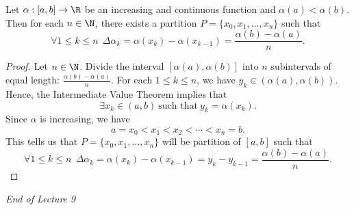 \begin{lemma}\label{lemma 2}
    Let \( \alpha:[a,b] \to \R  \) be an increasing and continuous function and \( \alpha(a) < \alpha(b) \). Then for each \( n \in \N \), there exists a partition \( P = \{  {x}_{0}, {x}_{1}, \dots, {x}_{n} \}  \) such that   
    \[  \forall 1 \leq k \leq n \ \ \Delta \alpha_k = \alpha({x}_{k}) - \alpha({x}_{k-1}) = \frac{ \alpha(b) - \alpha(a) }{  n  }. \]
\end{lemma}
\begin{proof}
    Let \( n \in \N \). Divide the interval \( [\alpha(a), \alpha(b)] \) into \( n  \) subintervals of equal length: \( \frac{ \alpha(b) - \alpha(a) }{ n  }  \). For each \( 1 \leq k \leq n  \), we have \( {y}_{k } \in (\alpha(a), \alpha(b)) \). Hence, the Intermediate Value Theorem implies that 
    \[  \exists {x}_{k } \in (a,b) \ \text{such that} \ {y}_{k } = \alpha({x}_{k}). \]
    Since \( \alpha  \) is increasing, we have 
    \[  a = {x}_{0} < {x}_{1} < {x}_{2} < \cdots < {x}_{n} = b.   \]
    This tells us that \( P = \{  {x}_{0},{x}_{1}, \dots, {x}_{n} \}  \) will be partition of \( [a,b] \) such that
    \[  \forall 1 \leq k \leq n  \ \ \Delta {\alpha}_{k } = \alpha({x}_{k}) - \alpha({x}_{k-1}) = {y}_{k } - {y}_{k-1} = \frac{ \alpha(b) - \alpha(a) }{ n }. \]
\end{proof}



\begin{center}
    \textit{End of Lecture 9} 
\end{center}


